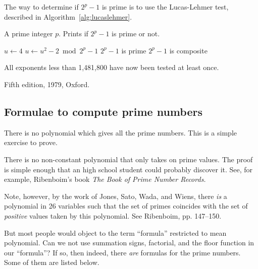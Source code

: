 \bigskip
\bigskip

The way to determine if $2^p-1$ is prime is to use the Lucas-Lehmer
test, described in Algorithm~\ref{alg:lucaslehmer}.

\newcommand{\lucaslehmer}{\ensuremath{\mbox{\sc Lucas-Lehmer}}}
\begin{algorithm}[H]
  \caption{$\lucaslehmer(n)$}\label{alg:lucaslehmer}
  \begin{algorithmic}[1]

    \REQUIRE A prime integer $p$.
    \ENSURE Prints if $2^p-1$ is prime or not.

    \smallskip

    \STATE $u \leftarrow 4$
        \STATE $u \leftarrow u^2-2 \bmod 2^p-1$
    \ENDFOR
       \PRINT $2^p-1$ is prime
    \ELSE
       \PRINT $2^p-1$ is composite
    \ENDIF
  \end{algorithmic}
\end{algorithm}

All exponents less than 1,481,800 have now been tested at least once.

\Ref

  {Fifth edition, 1979, Oxford.}

\subsection{Formulae to compute prime numbers}


There is no polynomial which gives all the prime numbers. This is a
simple exercise to prove.

There is no non-constant polynomial that only takes on prime values.
The proof is simple enough that an high school student could probably
discover it.  See, for example, Ribenboim's book {\it The Book of Prime
  Number Records.}

Note, however, by the work of Jones, Sato, Wada, and Wiens, there {\it
  is} a polynomial in 26 variables such that the set of primes coincides
with the set of {\it positive} values taken by this polynomial.  See
Ribenboim, pp. 147--150.

But most people would object to the term ``formula'' restricted to mean
polynomial.  Can we not use summation signs, factorial, and the floor
function in our ``formula''?  If so, then indeed, there {\it are}
formulas for the prime numbers.  Some of them are listed below.

